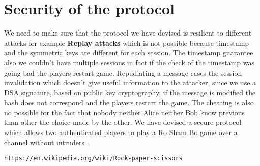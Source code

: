 \documentclass[11pt,a4paper]{article}
\begin{document}
	\section{Security of the protocol}
	We need to make sure that the protocol we have devised is resilient to different attacks for example \textbf{Replay attacks}  which is not possible because timestamp and the symmetric keys are different for each session. The timestamp guarantee also we couldn't have multiple sessions in fact if the check of the timestamp was going bad the players restart game. Repudiating a message cases the session invalidation which doesn't give useful information to the attacker, since we use a DSA signature, based on public key cryptography,
if the message is modified the
hash does not correspond and the players restart the game. 
The cheating is also no possible for the fact that nobody neither Alice neither Bob know previous than other the choice made by the other.
	We have devised a secure protocol which allows two authenticated players to play a Ro Sham Bo game over a channel without intruders .

	
   \newpage 
    
    
	\begin{thebibliography}{}
		\texttt{https://en.wikipedia.org/wiki/Rock-paper-scissors}
	\end{thebibliography}
\end{document}
